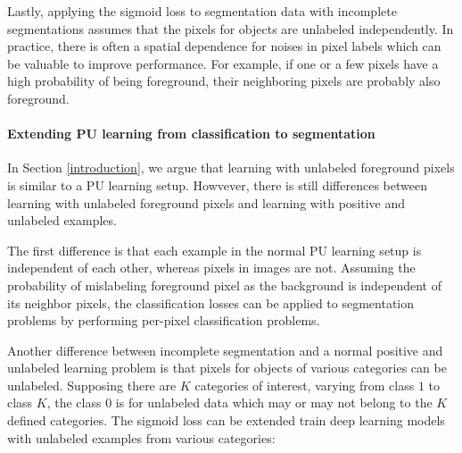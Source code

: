 Lastly, applying the sigmoid loss to segmentation data with incomplete segmentations assumes that the pixels for objects are unlabeled independently.
In practice, there is often a spatial dependence for noises in pixel labels which can be valuable to improve performance.
For example, if one or a few pixels have a high probability of being foreground, their neighboring pixels are probably also foreground.

\paragraph{Extending PU learning from classification to segmentation}
In Section \ref{introduction}, we argue that learning with unlabeled foreground pixels is similar to a PU learning setup.
Howvever, there is still differences between learning with unlabeled foreground pixels and learning with positive and unlabeled examples.

The first difference is that each example in the normal PU learning setup is independent of each other, whereas pixels in images are not.
Assuming the probability of mislabeling foreground pixel as the background is independent of its neighbor pixels, the classification losses can be applied to segmentation problems by performing per-pixel classification problems.

Another difference between incomplete segmentation and a normal positive and unlabeled learning problem is that pixels for objects of various categories can be unlabeled.
Supposing there are $K$ categories of interest, varying from class $1$ to class $K$, the class $0$ is for unlabeled data which may or may not belong to the $K$ defined categories.
The sigmoid loss can be extended train deep learning models with unlabeled examples from various categories:



